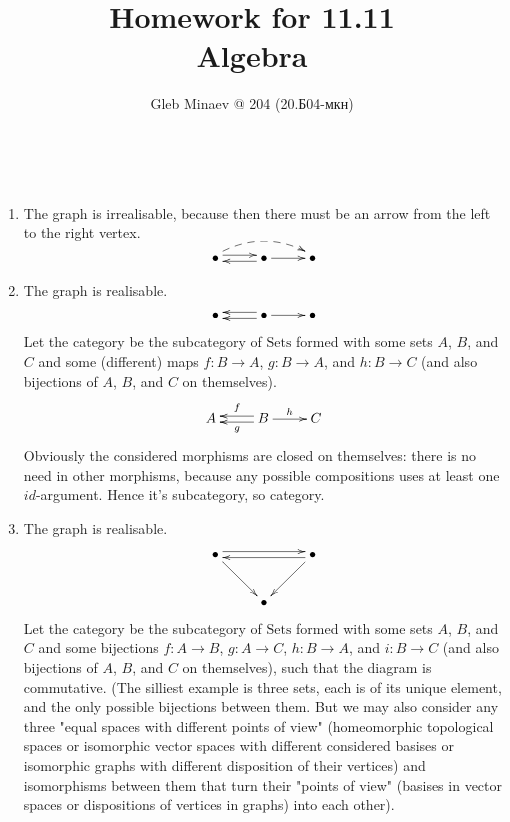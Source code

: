 \documentclass[12pt,a4paper]{article}
\title{Homework for 11.11\\Algebra}
\author{Gleb Minaev @ 204 (20.Б04-мкн)}
\date{}
\newcommand{\Sets}{\mathrm{Sets}}
\begin{document}
    \maketitle

    \begin{problem}{1}\ 
        \begin{enumerate}
            \item The graph is irrealisable, because then there must be an arrow from the left to the right vertex.
                \[
                    \xymatrix{
                        \bullet \ar@<0.5ex>[r] \ar@{-->}@/^1em/@<0.5ex>[rr] & \bullet \ar@<0.5ex>[l] \ar[r] & \bullet
                    }
                \]
            \item The graph is realisable.
                \[
                    \xymatrix{
                        \bullet & \bullet \ar@<0.5ex>[l] \ar@<-0.5ex>[l] \ar[r] & \bullet
                    }
                \]
                Let the category be the subcategory of $\Sets$ formed with some sets $A$, $B$, and $C$ and some (different) maps $f: B \to A$, $g: B \to A$, and $h: B \to C$ (and also bijections of $A$, $B$, and $C$ on themselves).
                \[
                    \xymatrix{
                        A & B \ar@<0.5ex>[l]^{g} \ar@<-0.5ex>[l]_{f} \ar[r]^{h} & C
                    }
                \]
                Obviously the considered morphisms are closed on themselves: there is no need in other morphisms, because any possible compositions uses at least one $id$-argument. Hence it's subcategory, so category.
            \item The graph is realisable.
                \[
                    \xymatrix{
                        \bullet \ar@<0.5ex>[rr] \ar[rd] && \bullet \ar@<0.5ex>[ll] \ar[ld] \\
                        & \bullet
                    }
                \]
                Let the category be the subcategory of $\Sets$ formed with some sets $A$, $B$, and $C$ and some bijections $f: A \to B$, $g: A \to C$, $h: B \to A$, and $i: B \to C$ (and also bijections of $A$, $B$, and $C$ on themselves), such that the diagram is commutative. (The silliest example is three sets, each is of its unique element, and the only possible bijections between them. But we may also consider any three "equal spaces with different points of view" (homeomorphic topological spaces or isomorphic vector spaces with different considered basises or isomorphic graphs with different disposition of their vertices) and isomorphisms between them that turn their "points of view" (basises in vector spaces or dispositions of vertices in graphs) into each other).

\end{enumerate}
\end{problem}
\end{document}
